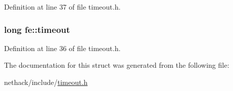 Definition at line 37 of file timeout.\+h.

\hypertarget{structfe_a923b10093fd44aa15ead4aac11212a92}{
\subsubsection[{timeout}]{\setlength{\rightskip}{0pt plus 5cm}long fe\+::timeout}}\label{structfe_a923b10093fd44aa15ead4aac11212a92}


Definition at line 36 of file timeout.\+h.



The documentation for this struct was generated from the following file\+:\begin{DoxyCompactItemize}
\item 
nethack/include/\hyperlink{timeout_8h}{timeout.\+h}\end{DoxyCompactItemize}
